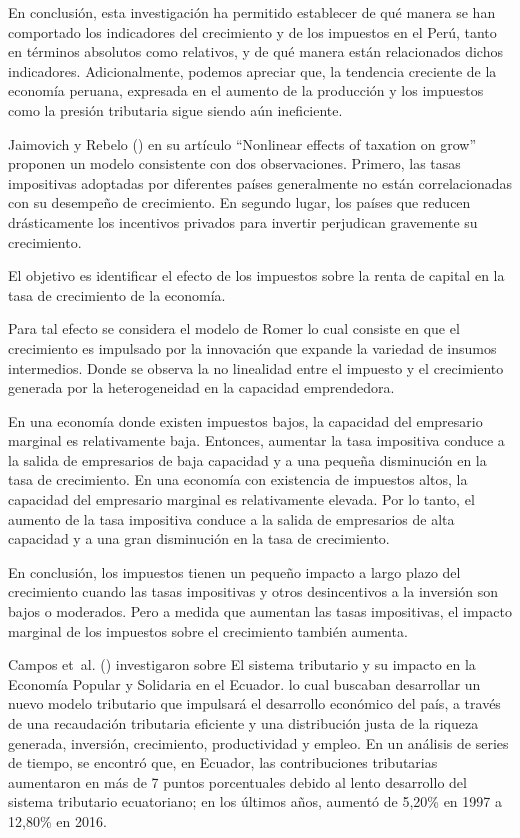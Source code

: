 \documentclass[
  jou,
  floatsintext,
  longtable,
  a4paper,
  nolmodern,
  notxfonts,
  notimes,
  12pt,
  colorlinks=true,linkcolor=blue,citecolor=blue,urlcolor=blue]{apa7}
\begin{document}
En conclusión, esta investigación ha permitido establecer de qué manera
se han comportado los indicadores del crecimiento y de los impuestos en
el Perú, tanto en términos absolutos como relativos, y de qué manera
están relacionados dichos indicadores. Adicionalmente, podemos apreciar
que, la tendencia creciente de la economía peruana, expresada en el
aumento de la producción y los impuestos como la presión tributaria
sigue siendo aún ineficiente.

Jaimovich y Rebelo () en su
artículo ``Nonlinear effects of taxation on grow'' proponen un modelo
consistente con dos observaciones. Primero, las tasas impositivas
adoptadas por diferentes países generalmente no están correlacionadas
con su desempeño de crecimiento. En segundo lugar, los países que
reducen drásticamente los incentivos privados para invertir perjudican
gravemente su crecimiento.

El objetivo es identificar el efecto de los impuestos sobre la renta de
capital en la tasa de crecimiento de la economía.

Para tal efecto se considera el modelo de Romer lo cual consiste en que
el crecimiento es impulsado por la innovación que expande la variedad de
insumos intermedios. Donde se observa la no linealidad entre el impuesto
y el crecimiento generada por la heterogeneidad en la capacidad
emprendedora.

En una economía donde existen impuestos bajos, la capacidad del
empresario marginal es relativamente baja. Entonces, aumentar la tasa
impositiva conduce a la salida de empresarios de baja capacidad y a una
pequeña disminución en la tasa de crecimiento. En una economía con
existencia de impuestos altos, la capacidad del empresario marginal es
relativamente elevada. Por lo tanto, el aumento de la tasa impositiva
conduce a la salida de empresarios de alta capacidad y a una gran
disminución en la tasa de crecimiento.

En conclusión, los impuestos tienen un pequeño impacto a largo plazo del
crecimiento cuando las tasas impositivas y otros desincentivos a la
inversión son bajos o moderados. Pero a medida que aumentan las tasas
impositivas, el impacto marginal de los impuestos sobre el crecimiento
también aumenta.

Campos et~al. () investigaron
sobre El sistema tributario y su impacto en la Economía Popular y
Solidaria en el Ecuador. lo cual buscaban desarrollar un nuevo modelo
tributario que impulsará el desarrollo económico del país, a través de
una recaudación tributaria eficiente y una distribución justa de la
riqueza generada, inversión, crecimiento, productividad y empleo. En un
análisis de series de tiempo, se encontró que, en Ecuador, las
contribuciones tributarias aumentaron en más de 7 puntos porcentuales
debido al lento desarrollo del sistema tributario ecuatoriano; en los
últimos años, aumentó de 5,20\% en 1997 a 12,80\% en 2016.
\end{document}

